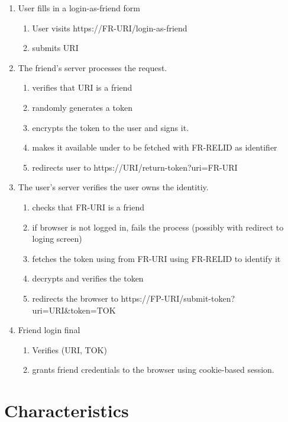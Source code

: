 \documentclass[letterpaper,11pt,oneside]{article}
\begin{document}
\begin{enumerate}
\item User fills in a login-as-friend form
	\begin{enumerate}
	\item User visits https://FR-URI/login-as-friend
	\item submits URI
	\end{enumerate}

\item The friend's server processes the request.
	\begin{enumerate}
	\item verifies that URI is a friend
	\item randomly generates a token
	\item encrypts the token to the user and signs it.
	\item makes it available under to be fetched with FR-RELID as identifier
	\item redirects user to https://URI/return-token?uri=FR-URI
	\end{enumerate}

\item  The user's server verifies the user owns the identitiy.
	\begin{enumerate}
	\item checks that FR-URI is a friend
	\item if browser is not logged in, fails the process (possibly with redirect to loging screen)
	\item fetches the token using from FR-URI using FR-RELID to identify it
	\item decrypts and verifies the token
	\item redirects the browser to https://FP-URI/submit-token?uri=URI\&token=TOK
	\end{enumerate}

\item Friend login final
	\begin{enumerate}
	\item Verifies (URI, TOK)
	\item grants friend credentials to the browser using cookie-based session.
	\end{enumerate}
\end{enumerate}

\section{Characteristics}
\end{document}
